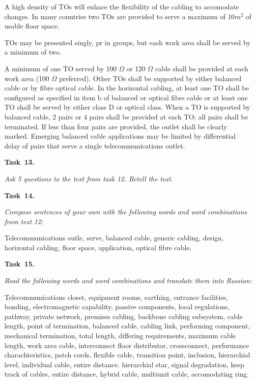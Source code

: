 A high density of TOs will enhace the flexibility of the cabling to accomodate changes. In many countries two TOs are
provided to serve a maximum of $10m^2$ of usable floor space.\par

TOs may be presented singly, pr in groups, but each work area shall be served by a minimum of two.\par

A minimum of one TO served by 100 $\Omega$ or 120 $\Omega$ cable shall be provided at each work area (100 $\Omega$ preferred).
Other TOs shall be supported by either balanced cable or by fibre optical cable. In the horizontal cabling, at least one
TO shall be configured as specified in item b of balanced or optical fibre cable or at least one TO shall be served by 
either class D or optical class. When a TO is supported by balanced cable, 2 pairs or 4 pairs shall be provided at each TO;
all pairs shall be terminated. If less than four pairs are provided, the outlet shall be clearly marked. Emerging balanced
cable applications may be limited by differential delay of pairs that serve a single telecommunications outlet.\par

{\bf Task~13.}~~{\it Ask 5 questions to the text from task 12. Retell the text. \par}

{\bf Task~14.}~~{\it Compose sentences of your own with the following words and word combinations from text 12: \par}

Telecommunications outle, serve, balanced cable, generic cabling, design, horizontal cabling, floor space, application,
optical fibre cable.\par

{\bf Task~15.}~~{\it Read the following words and word combinations and translate them into Russian: \par}

Telecommunications closet, equipment rooms, earthing, entrance facilities, bonding,
electromagnetic capability, passive components, local regulations, pathway, private network,
premises cabling, backbone cabling subsystem, cable length, point of termination, balanced cable,
cabling link, performing component, mechanical termination, total length, differing requirements,
maximum cable length, work area cable, interconnect floor distributor, crossconnect, performance
charachteristics, patch cords, flexible cable, transition point, inclusion, hierarchial level, individual
cable, entire distance. hierarchial star, signal degradation, keep track of cables, entire distance,
hybrid cable, multiunit cable, accomodating ring.\par


